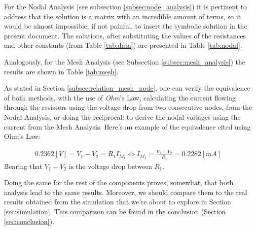 For the Nodal Analysis (see subsection \ref{subsec:node_analysis}) it is pertinent to address that the solution is a matrix with an incredible amount of terms, so it would be almost impossible, if not painful, to insert the symbolic solution in the present document. The solutions, after substituting the values of the resistances and other constants (from Table \ref{tab:data}) are presented in Table \ref{tab:nodal}.

Analogously, for the Mesh Analysis (see Subsection \ref{subsec:mesh_analysis}) the results are shown in Table \ref{tab:mesh}.

As stated in Section \ref{subsec:relation_mesh_node}, one can verify the equivalence of both methods, with the use of \textit{Ohm}'s Law, calculating the current flowing through the resistors using the voltage drop from two consecutive nodes, from the Nodal Analysis, or doing the reciprocal: to derive the nodal voltages using the current from the Mesh Analysis.
Here's an example of the equivalence cited using Ohm's Law:

\begin{align}
    0.2362 [V] = V_1-V_2 = R_1I_{M_1} 
    \Longleftrightarrow I_{M_1} = \frac{V_1-V_2}{R_1} = 0.2282 [mA]  
\end{align}
Bearing that $V_1-V_2$ is the voltage drop between $R_1$.

Doing the same for the rest of the components proves, somewhat, that both analysis lead to the same results. Moreover, we should compare them to the real results obtained from the simulation that we're about to explore in Section \ref{sec:simulation}. This comparison can be found in the conclusion (Section \ref{sec:conclusion}).

\clearpage
